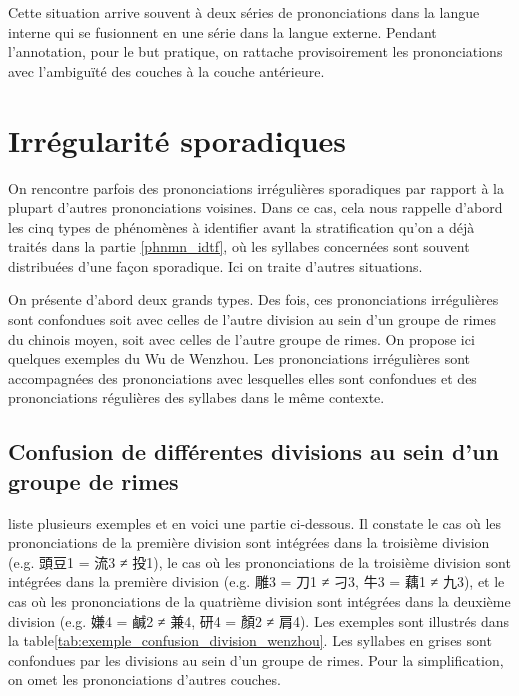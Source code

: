\documentclass{scrbook}
\newcounter{c}[subsubsection]
\newcommand{\illustre}{Les exemples sont illustrés dans la table\xspace}
\begin{document}
\begin{sloppypar}
Cette situation arrive souvent à deux séries de prononciations dans la langue interne qui se fusionnent en une série dans la langue externe. Pendant l'annotation, pour le but pratique, on rattache provisoirement les prononciations avec l'ambiguïté des couches à la couche antérieure.

\section{Irrégularité sporadiques}\label{sporadique}
On rencontre parfois des prononciations irrégulières sporadiques par rapport à la plupart d'autres prononciations voisines. Dans ce cas, cela nous rappelle d'abord les cinq types de phénomènes à identifier avant la stratification qu'on a déjà traités dans la partie \ref{phnmn_idtf}, où les syllabes concernées sont souvent distribuées d'une façon sporadique. Ici on traite d'autres situations. 

On présente d'abord deux grands types. Des fois, ces prononciations irrégulières sont confondues soit avec celles de l'autre division au sein d'un groupe de rimes du chinois moyen, soit avec celles de l'autre groupe de rimes. On propose ici quelques exemples du Wu de Wenzhou. Les prononciations irrégulières sont accompagnées des prononciations avec lesquelles elles sont confondues et des prononciations régulières des syllabes dans le même contexte. 

\subsection{Confusion de différentes divisions au sein d'un groupe de rimes}\label{confusion_division}
\textcite{Zhengzhang1989liu_wenzhou} liste plusieurs exemples et en voici une partie ci-dessous. Il constate le cas où les prononciations de la première division sont intégrées dans la troisième division (e.g. 頭豆1 = 流3 ≠ 投1), le cas où les prononciations de la troisième division sont intégrées dans la première division (e.g. 雕3 = 刀1 ≠ 刁3, 牛3 = 藕1 ≠ 九3), et le cas où les prononciations de la quatrième division sont intégrées dans la deuxième division (e.g. 嫌4 = 鹹2 ≠ 兼4, 研4 = 顏2 ≠ 肩4). %
\illustre \ref{tab:exemple_confusion_division_wenzhou}. Les syllabes en grises sont confondues par les divisions au sein d'un groupe de rimes. Pour la simplification, on omet les prononciations d'autres couches.


\end{sloppypar}
\end{document}
